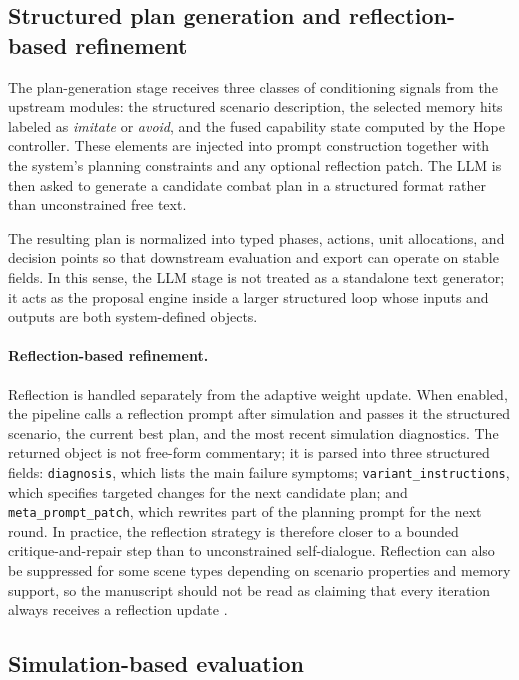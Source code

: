 \subsection{Structured plan generation and reflection-based refinement}

The plan-generation stage receives three classes of conditioning signals from the upstream modules: the structured scenario description, the selected memory hits labeled as \textit{imitate} or \textit{avoid}, and the fused capability state computed by the Hope controller. These elements are injected into prompt construction together with the system's planning constraints and any optional reflection patch. The LLM is then asked to generate a candidate combat plan in a structured format rather than unconstrained free text.

The resulting plan is normalized into typed phases, actions, unit allocations, and decision points so that downstream evaluation and export can operate on stable fields. In this sense, the LLM stage is not treated as a standalone text generator; it acts as the proposal engine inside a larger structured loop whose inputs and outputs are both system-defined objects.

\paragraph{Reflection-based refinement.}
Reflection is handled separately from the adaptive weight update. When enabled, the pipeline calls a reflection prompt after simulation and passes it the structured scenario, the current best plan, and the most recent simulation diagnostics. The returned object is not free-form commentary; it is parsed into three structured fields: \texttt{diagnosis}, which lists the main failure symptoms; \texttt{variant\_instructions}, which specifies targeted changes for the next candidate plan; and \texttt{meta\_prompt\_patch}, which rewrites part of the planning prompt for the next round. In practice, the reflection strategy is therefore closer to a bounded critique-and-repair step than to unconstrained self-dialogue. Reflection can also be suppressed for some scene types depending on scenario properties and memory support, so the manuscript should not be read as claiming that every iteration always receives a reflection update \citep{shinn2023reflexion,madaan2023selfrefine}.

\subsection{Simulation-based evaluation}

